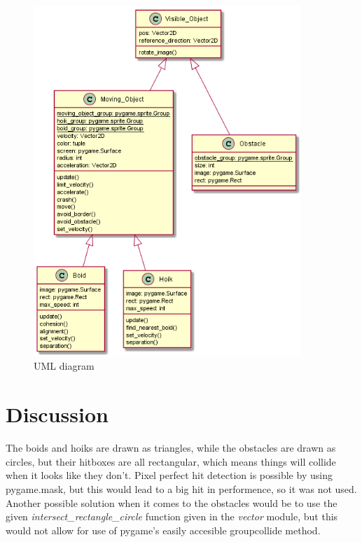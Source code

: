 \documentclass{article}
\begin{document}
\begin{figure}[h!]
    \includegraphics[width = 0.9\textwidth]{Boids.png}
    \caption{UML diagram}
    \label{fig: uml}
\end{figure}

\section{Discussion}
The boids and hoiks are drawn as triangles, while the obstacles are drawn as circles, but their hitboxes are all rectangular, which means things will collide when it looks like they don't. Pixel perfect hit detection is possible by using pygame.mask, but this would lead to a big hit in performence, so it was not used. Another possible solution when it comes to the obstacles would be to use the given \emph{intersect\_rectangle\_circle} function given in the \emph{vector} module, but this would not allow for use of pygame's easily accesible groupcollide method. 

\paragraph{}
\end{document}
